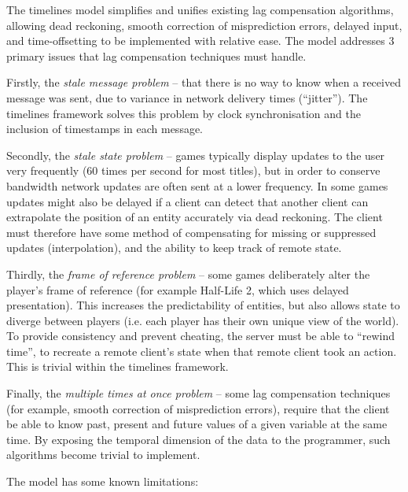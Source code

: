 \documentclass[conference]{IEEEtran}
\begin{document}
	The timelines model simplifies and unifies existing lag compensation algorithms, allowing dead reckoning, smooth correction of misprediction errors, delayed input, and time-offsetting to be implemented with relative ease. The model addresses 3 primary issues that lag compensation techniques must handle.

	Firstly, the \emph{stale message problem} -- that there is no way to know when a received message was sent, due to variance in network delivery times (``jitter''). The timelines framework solves this problem by clock synchronisation and the inclusion of timestamps in each message.

	Secondly, the \emph{stale state problem} -- games typically display updates to the user very frequently (60 times per second for most titles), but in order to conserve bandwidth network updates are often sent at a lower frequency. In some games updates might also be delayed if a client can detect that another client can extrapolate the position of an entity accurately via dead reckoning. The client must therefore have some method of compensating for missing or suppressed updates (interpolation), and the ability to keep track of remote state.

	Thirdly, the \emph{frame of reference problem} -- some games deliberately alter the player's frame of reference (for example Half-Life 2, which uses delayed presentation). This increases the predictability of entities, but also allows state to diverge between players (i.e. each player has their own unique view of the world). To provide consistency and prevent cheating, the server must be able to ``rewind time'', to recreate a remote client's state when that remote client took an action. This is trivial within the timelines framework.

	Finally, the \emph{multiple times at once problem} -- some lag compensation techniques (for example, smooth correction of misprediction errors), require that the client be able to know past, present and future values of a given variable at the same time. By exposing the temporal dimension of the data to the programmer, such algorithms become trivial to implement.

	The model has some known limitations:
\end{document}

